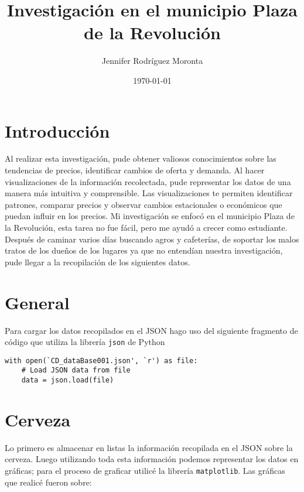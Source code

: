 \documentclass[a4paper, 12pt]{article}
\begin{document}
\title{Investigación en el municipio Plaza de la Revolución}
\author{Jennifer Rodríguez Moronta}
\date{\today}

\maketitle

\section{Introducción}

Al realizar esta investigación, pude obtener valiosos conocimientos sobre las tendencias 
de precios, identificar cambios de oferta y demanda. Al hacer 
visualizaciones de la información recolectada, pude representar los datos de una manera más
intuitiva y comprensible. Las visualizaciones te permiten identificar patrones, comparar precios y
observar cambios estacionales o económicos que puedan influir en los precios. Mi investigación se enfocó 
en el municipio Plaza de la Revolución, esta tarea no fue fácil, pero me 
ayudó a crecer como estudiante. Después de caminar varios días buscando agros y cafeterías, de
 soportar los malos tratos de los dueños de los lugares ya que no entendían nuestra investigación, 
 pude llegar a la recopilación de los siguientes datos.

\section{General}
Para cargar los datos recopilados en el JSON hago uso del siguiente fragmento de código que 
utiliza la librería \texttt{json} de Python 
\begin{lstlisting}
with open(`CD_dataBase001.json', `r') as file:
    # Load JSON data from file
    data = json.load(file)
\end{lstlisting}

\section{Cerveza}

Lo primero es almacenar en listas la información recopilada en el JSON sobre la cerveza. Luego 
utilizando toda esta información podemos representar los datos en gráficas; para el proceso de graficar
utilicé la librería \texttt{matplotlib}. Las gráficas que realicé fueron sobre:
\end{document}
